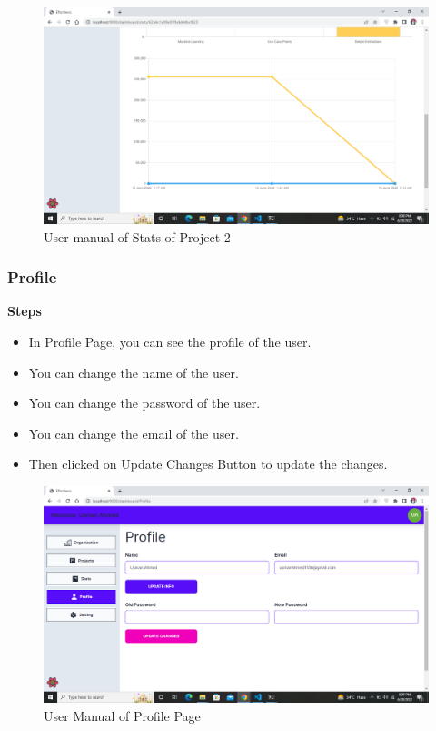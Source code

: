 \begin{figure}[H]
    \centering
    \includegraphics[scale=0.4]{./diagrams/user-manual/Screenshot (27).png}
    \caption{User manual of Stats of Project 2}
    \label{fig:user-1}

\end{figure}

\subsubsection{Profile}
\textbf{Steps}
\begin{itemize}
    \item In Profile Page, you can see the profile of the user.
    \item You can change the name of the user.
    \item You can change the password of the user.
    \item You can change the email of the user.
    \item Then clicked on Update Changes Button to update the changes.

\end{itemize}

\begin{figure}[H]
    \centering
    \includegraphics[scale=0.4]{./diagrams/user-manual/Screenshot (28).png}
    \caption{User Manual of Profile Page}
    \label{fig:user-1}

\end{figure}

